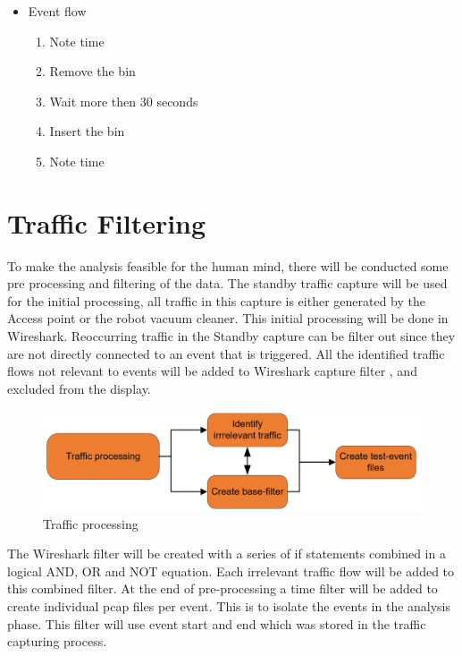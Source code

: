 \begin{itemize}
    \item Event flow \begin{enumerate}
                                    \item Note time
                                    \item Remove the bin
                                    \item Wait  more then 30 seconds
                                    \item Insert the bin
                                    \item Note time
                                \end{enumerate}
\end{itemize}

\section{Traffic Filtering}
To make the analysis feasible for the human mind, there will be conducted some pre processing and filtering of the data. The standby traffic capture will be used for the initial processing, all traffic in this capture is either generated by the Access point or the robot vacuum cleaner. This initial processing will be done in Wireshark. Reoccurring traffic in the Standby capture can be filter out since they are not directly connected to an event that is triggered. All the identified traffic flows not relevant to events will be added to Wireshark capture filter \cite{wireshark}, and excluded from the display.

\begin{figure}[H]
    \centering
    \includegraphics[width=\textwidth]{figures/TrafficProcessingProcess.png}
    \caption{Traffic processing}
    \label{fig:TrafficProcessingProcess}
\end{figure}


The Wireshark filter will be created with a series of if statements combined in a logical AND, OR and NOT equation. Each irrelevant traffic flow will be added to this combined filter. At the end of pre-processing a time filter will be added to create individual pcap files per event. This is to isolate the events in the analysis phase. This filter will use event start and end which was stored in the traffic capturing process. 

